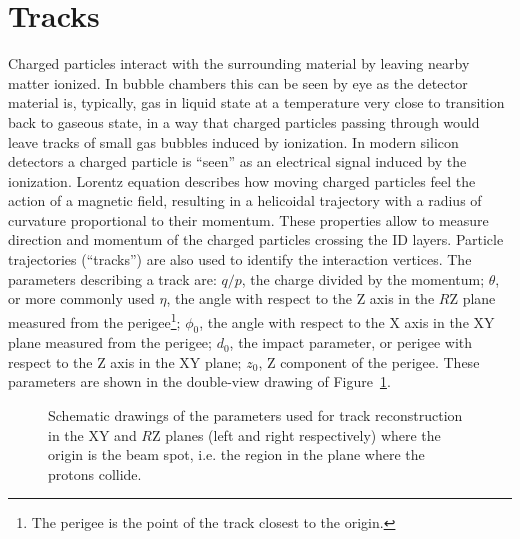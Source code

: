 
\section{Tracks}\label{sec:tracks}

Charged particles interact with the surrounding material by
leaving nearby matter ionized. In bubble chambers this can be
seen by eye as the detector material is, typically, gas in liquid
state at a temperature very close to transition back to gaseous state,
in a way that charged particles passing through would leave tracks of
small gas bubbles induced by ionization. In modern silicon detectors
a charged particle is ``seen'' as an electrical signal induced by the
ionization. Lorentz equation describes how moving charged particles
feel the action of a magnetic field, resulting in a helicoidal trajectory with a
radius of curvature proportional to their momentum. These properties allow
to measure direction and momentum of the charged particles crossing
the ID layers. Particle trajectories (``tracks'') are 
also used to identify the interaction vertices.
The parameters describing a track are: $q/p$, the charge divided by the momentum; $\theta$, or more commonly used $\eta$, the angle
with respect to the Z axis in the $R$Z plane measured from the 
perigee\footnote{The perigee is the point of the track closest to the origin.}; $\phi_0$, the angle 
with respect to the X axis in the XY plane measured from the perigee; $d_0$, the impact parameter, 
or perigee with respect to the Z axis in the XY plane; $z_0$, Z component of the perigee.
These parameters are shown in the double-view drawing of Figure~\ref{fig:trackpar}.

\begin{figure}[tb]\begin{center}
	\caption[bla]{Schematic drawings of the parameters used for track 
        reconstruction in the XY and $R$Z planes (left and right respectively)
          where the origin is the beam spot, i.e. the region in the plane where the protons collide.
\label{fig:trackpar}}
\end{center}\end{figure}

